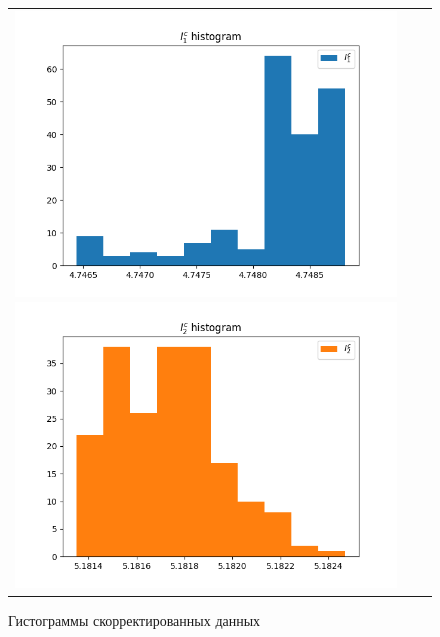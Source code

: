 \documentclass[a4paper,14pt]{article}
\begin{document}
	\begin{figure}[H]
		\begin{tabular}{ccc}
			\includegraphics[scale=0.5]{../image/fhyst_PR1.png}
			\includegraphics[scale=0.5]{../image/fhyst_PR2.png}
		\end{tabular}
		\caption{Гистограммы скорректированных данных} 
	\end{figure}
	
\end{document}
